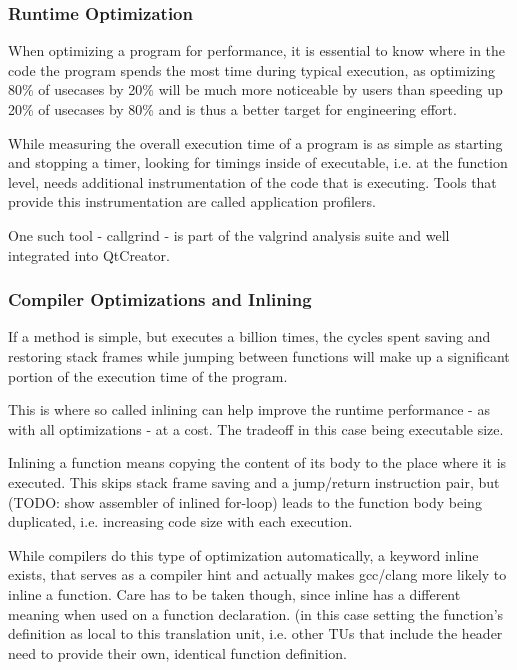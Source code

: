 \subsubsection{Runtime Optimization}
When optimizing a program for performance, it is essential to know where in the code the program spends the most time during typical execution, as optimizing 80\% of usecases by 20\% will be much more noticeable by users than speeding up 20\% of usecases by 80\% and is thus a better target for engineering effort.

While measuring the overall execution time of a program is as simple as starting and stopping a timer, looking for timings inside of executable, i.e. at the function level, needs additional instrumentation of the code that is executing. Tools that provide this instrumentation are called application profilers.


One such tool - callgrind - is part of the valgrind analysis suite and well integrated into QtCreator.

\subsubsection{Compiler Optimizations and Inlining}
If a method is simple, but executes a billion times, the cycles spent saving and restoring stack frames while jumping between functions will make up a significant portion of the execution time of the program.

This is where so called inlining can help improve the runtime performance - as with all optimizations - at a cost. The tradeoff in this case being executable size.

Inlining a function means copying the content of its body to the place where it is executed. This skips stack frame saving and a jump/return instruction pair, but (TODO: show assembler of inlined for-loop) leads to the function body being duplicated, i.e. increasing code size with each execution.

While compilers do this type of optimization automatically, a keyword inline exists, that serves as a compiler hint and actually makes gcc/clang more likely to inline a function. Care has to be taken though, since inline has a different meaning when used on a function declaration. (in this case setting the function's definition as local to this translation unit, i.e. other TUs that include the header need to provide their own, identical function definition.

